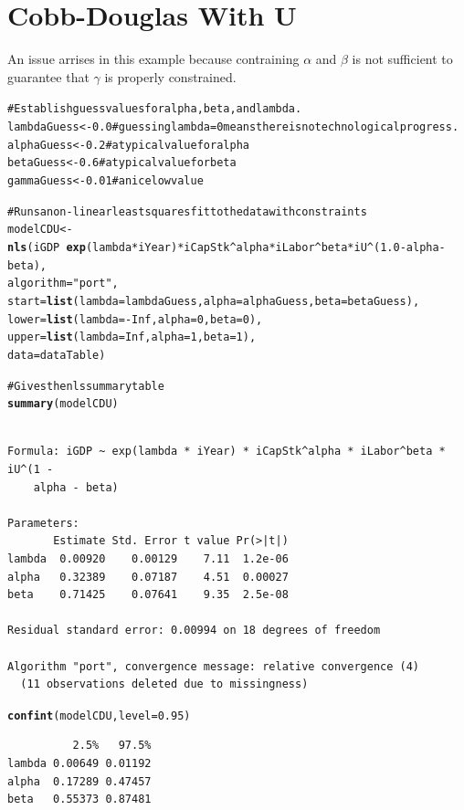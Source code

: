 \documentclass[preprint,authoryear,12pt]{elsarticle}\usepackage{graphicx, color}
\makeatletter
\newcommand{\hlfunctioncall}[1]{\textcolor[rgb]{0.501960784313725,0,0.329411764705882}{\textbf{#1}}}%
\newcommand{\hlstring}[1]{\textcolor[rgb]{0.6,0.6,1}{#1}}%
\newcommand{\hlcomment}[1]{\textcolor[rgb]{0.180392156862745,0.6,0.341176470588235}{#1}}%
\newenvironment{kframe}{%
 \def\at@end@of@kframe{}%
 \ifinner\ifhmode%
  \def\at@end@of@kframe{\end{minipage}}%
  \begin{minipage}{\columnwidth}%
 \fi\fi%
 \def\FrameCommand##1{\hskip\@totalleftmargin \hskip-\fboxsep
 \colorbox{shadecolor}{##1}\hskip-\fboxsep
     \hskip-\linewidth \hskip-\@totalleftmargin \hskip\columnwidth}%
 \MakeFramed {\advance\hsize-\width
   \@totalleftmargin\z@ \linewidth\hsize
   \@setminipage}}%
 {\par\unskip\endMakeFramed%
 \at@end@of@kframe}
\newenvironment{knitrout}{}{} %
\makeatother
\begin{document}
\section{Cobb-Douglas With U}

An issue arrises in this example because contraining $\alpha$ and $\beta$ is not sufficient to 
guarantee that $\gamma$ is properly constrained.

\begin{knitrout}
\color{fgcolor}\begin{kframe}
\begin{alltt}
\hlcomment{# Establish guess values for alpha, beta, and lambda.}
lambdaGuess <- 0.0 \hlcomment{# guessing lambda = 0 means there is no technological progress.}
alphaGuess <- 0.2 \hlcomment{# a typical value for alpha}
betaGuess <- 0.6 \hlcomment{# a typical value for beta}
gammaGuess <- 0.01 \hlcomment{# a nice low value}

\hlcomment{# Runs a non-linear least squares fit to the data with constraints}
modelCDU <- \hlfunctioncall{nls}(iGDP ~ \hlfunctioncall{exp}(lambda*iYear) * iCapStk^alpha * iLabor^beta * iU^(1.0 - alpha - beta), 
                algorithm=\hlstring{"port"},
                start = \hlfunctioncall{list}(lambda=lambdaGuess, alpha=alphaGuess, beta=betaGuess),
                lower = \hlfunctioncall{list}(lambda=-Inf, alpha=0, beta=0),
                upper = \hlfunctioncall{list}(lambda=Inf, alpha=1, beta=1),
                data=dataTable)

\hlcomment{# Gives the nls summary table}
\hlfunctioncall{summary}(modelCDU)
\end{alltt}
\begin{verbatim}

Formula: iGDP ~ exp(lambda * iYear) * iCapStk^alpha * iLabor^beta * iU^(1 - 
    alpha - beta)

Parameters:
       Estimate Std. Error t value Pr(>|t|)
lambda  0.00920    0.00129    7.11  1.2e-06
alpha   0.32389    0.07187    4.51  0.00027
beta    0.71425    0.07641    9.35  2.5e-08

Residual standard error: 0.00994 on 18 degrees of freedom

Algorithm "port", convergence message: relative convergence (4) 
  (11 observations deleted due to missingness)
\end{verbatim}
\begin{alltt}
\hlfunctioncall{confint}(modelCDU, level = 0.95)
\end{alltt}


{\ttfamily\noindent\itshape\color{messagecolor}{Waiting for profiling to be done...}}\begin{verbatim}
          2.5%   97.5%
lambda 0.00649 0.01192
alpha  0.17289 0.47457
beta   0.55373 0.87481
\end{verbatim}
\end{kframe}
\end{knitrout}
\end{document}
